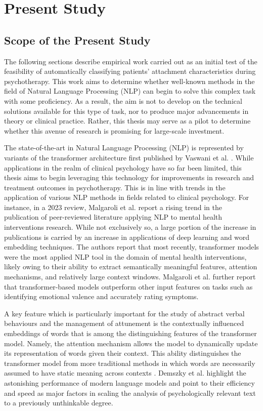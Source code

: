 \documentclass[12pt]{report}
\begin{document}
\chapter{Present Study}
\section{Scope of the Present Study}
The following sections describe empirical work carried out as an initial test of the feasibility of automatically classifying patients' attachment characteristics during psychotherapy.
This work aims to determine whether well-known methods in the field of Natural Language Processing (NLP) can begin to solve this complex task with some proficiency.
As a result, the aim is not to develop on the technical solutions available for this type of task, nor to produce major advancements in theory or clinical practice.
Rather, this thesis may serve as a pilot to determine whether this avenue of research is promising for large-scale investment.

The state-of-the-art in Natural Language Processing (NLP) is represented by variants of the transformer architecture first published by Vaswani et al. \citeyear{Vaswani2017}.
While applications in the realm of clinical psychology have so far been limited, this thesis aims to begin leveraging this technology for improvements in research and treatment outcomes in psychotherapy.
This is in line with trends in the application of various NLP methods in fields related to clinical psychology.
For instance, in a 2023 review, Malgaroli et al. \citeyear{Malgaroli2023} report a rising trend in the publication of peer-reviewed literature applying NLP to mental health interventions research.
While not exclusively so, a large portion of the increase in publications is carried by an increase in applications of deep learning and word embedding techniques.
The authors report that most recently, transformer models were the most applied NLP tool in the domain of mental health interventions, likely owing to their ability to extract semantically meaningful features, attention mechanisms, and relatively large context windows.
Malgaroli et al. \citeyear{Malgaroli2023} further report that transformer-based models outperform other input features on tasks such as identifying emotional valence and accurately rating symptoms.

A key feature which is particularly important for the study of abstract verbal behaviours and the management of attunement is the contextually influenced embeddings of words that is among the distinguishing features of the transformer model.
Namely, the attention mechanism allows the model to dynamically update its representation of words given their context.
This ability distinguishes the transformer model from more traditional methods in which words are necessarily assumed to have static meaning across contexts \cite{Demszky2023}.
Demszky et al. \citeyear{Demszky2023} highlight the astonishing performance of modern language models and point to their efficiency and speed as major factors in scaling the analysis of psychologically relevant text to a previously unthinkable degree.
\end{document}
